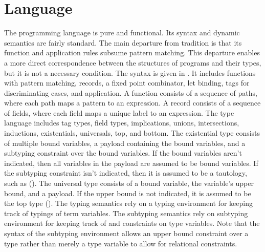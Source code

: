 \documentclass[acmsmall]{acmart}
\begin{document}
\section{Language}
The programming language is pure and functional. Its syntax and dynamic semantics 
are fairly standard. The main departure from tradition is that its function
and application rules subsume pattern matching. This departure enables a more direct  
correspondence between the structures of programs and their types, but it is 
not a necessary condition.
The syntax is given in .
It includes functions with pattern matching, records, a fixed point combinator, let binding, 
tags for discriminating cases, and application.
A function consists of a sequence of paths, where each path maps a pattern to an expression.
A record consists of a sequence of fields, where each field maps a unique label to an expression. 
The type language includes tag types, field types, implications, unions, intersections, 
inductions, existentials, universals, top, and bottom. 
The existential type consists of multiple bound variables, a payload containing the bound variables, 
and a subtyping constraint over the bound variables. 
If the bound variables aren't indicated, then all variables in the payload are
assumed to be bound variables. If the subtyping constraint isn't indicated, then it is assumed to 
be a tautology, such as ().
The universal type consists of a bound variable, the variable's upper bound, and a payload. If the upper
bound is not indicated, it is assumed to be the top type ().
The typing semantics rely on a typing environment for keeping track of typings of term variables.
The subtyping semantics rely on subtyping environment for keeping track of and constraints on type variables. 
Note that the syntax of the subtyping environment allows an upper bound constraint over a type
rather than merely a type variable to allow for relational constraints. 


\end{document}
